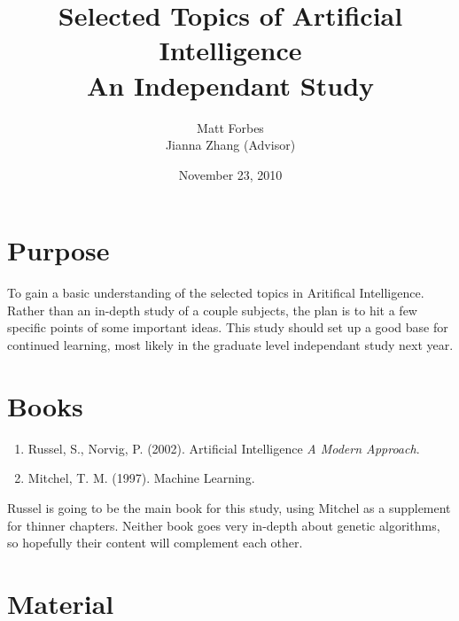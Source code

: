 \documentclass[a4paper,12pt]{article}
\begin{document}
\title{Selected Topics of Artificial Intelligence\\
{\normalsize An Independant Study}}
\author{Matt Forbes \\ Jianna Zhang (Advisor)}
\date{November 23, 2010}
\maketitle

\section*{Purpose}
To gain a basic understanding of the selected topics in Aritifical
Intelligence. Rather than an in-depth study of a couple subjects, the
plan is to hit a few specific points of some important ideas. This
study should set up a good base for continued learning, most likely in
the graduate level independant study next year.

\section*{Books}

\begin{enumerate}[1)]

\item Russel, S., Norvig, P. (2002). Artificial Intelligence {\it A Modern Approach}.
\item Mitchel, T. M. (1997). Machine Learning.
  
\end{enumerate}

Russel is going to be the main book for this study, using Mitchel as a
supplement for thinner chapters. Neither book goes very in-depth about
genetic algorithms, so hopefully their content will complement each other.

\section*{Material}
\end{document}
